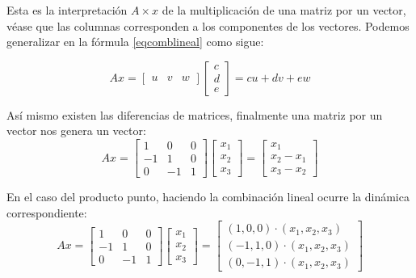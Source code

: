 Esta es la interpretación $A \times x$ de la multiplicación de una matriz por un vector, véase que las columnas corresponden
a los componentes de los vectores. Podemos generalizar en la fórmula \eqref{eqcomblineal} como sigue:

\begin{equation}
	\label{eqcomblineal}
	Ax= \begin{bmatrix} u & v & w \end{bmatrix}\begin{bmatrix} c\\ d\\ e \end{bmatrix}= cu+dv+ew
\end{equation}

Así mismo existen las diferencias de matrices, finalmente una matriz por un vector nos genera un vector:
\begin{equation}
	Ax=\begin{bmatrix}
		1  & 0  & 0 \\
		-1 & 1  & 0 \\
		0  & -1 & 1
	\end{bmatrix}
	\begin{bmatrix}
		x_1\\
		x_2\\
		x_{3}
	\end{bmatrix}=
	\begin{bmatrix}
		x_1      \\
		x_2 -x_1\\
		x_{3}-x_2 
	\end{bmatrix}
\end{equation}

En el caso del producto punto, haciendo la combinación lineal ocurre la dinámica correspondiente:
\[Ax=\begin{bmatrix} 1 & 0 &0 \\ -1 & 1 &0 \\ 0 &-1 & 1 \end{bmatrix} \begin{bmatrix} x_{1}\\ x_2 \\ x_3 \end{bmatrix}= \begin{bmatrix} (1,0,0)\cdot (x_{1},x_2 ,x_{3}) \\ (-1,1,0)\cdot (x_{1},x_2 ,x_{3}) \\ (0,-1,1)\cdot (x_{1},x_2 ,x_{3}) \end{bmatrix}\]

